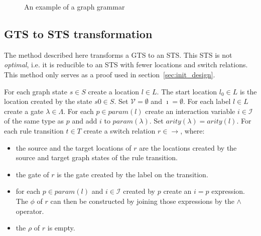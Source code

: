 \begin{figure}[ht]
  \begin{center}
    \hspace{20px}
    \hspace{20px}

    \hspace{20px}
    \hspace{20px}
  \end{center}
  \caption{An example of a graph grammar}
  \label{fig:gts}
\end{figure}

\subsection{GTS to STS transformation}\label{sec:gts_sts_trafo}
The method described here transforms a GTS to an STS. This STS is not \textit{optimal}, i.e. it is reducible to an STS with fewer locations and switch relations. This method only serves as a proof used in section~\ref{sec:init_design}.

For each graph state $s \in S$ create a location $l \in L$. The start location $l_0 \in L$ is the location created by the state $s0 \in S$. Set $\mathcal{V} = \emptyset$ and $\imath = \emptyset$. For each label $l \in L$ create a gate $\lambda \in \Lambda$. For each $p \in \mathit{param}(l)$ create an interaction variable $i \in \mathcal{I}$ of the same type as $p$ and add $i$ to $param(\lambda)$. Set $\mathit{arity}(\lambda) = \mathit{arity}(l)$. For each rule transition $t \in T$ create a switch relation $r \in \rightarrow$, where:
\begin{itemize}
  \item the source and the target locations of $r$ are the locations created by the source and target graph states of the rule transition.
  \item the gate of $r$ is the gate created by the label on the transition.
  \item for each $p \in \mathit{param}(l)$ and $i \in \mathcal{I}$ created by $p$ create an $i = p$ expression. The $\phi$ of $r$ can then be constructed by joining those expressions by the $\land$ operator.
  \item the $\rho$ of $r$ is empty.
\end{itemize}

